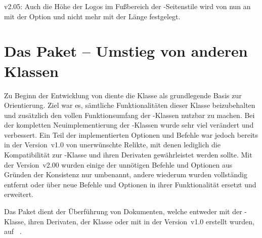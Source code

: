 \begin{Obsolete}{v2.05:}{}%
\printobsoletelist%
%
Auch die Höhe der Logos im Fußbereich der -Seitenstile 
wird von nun an mit der Option  und nicht mehr mit der 
Länge  festgelegt.
\end{Obsolete}



\section{Das Paket  -- Umstieg von anderen Klassen}
\begin{Bundle*}{}
%
%

\noindent{}

\bigskip\noindent
Zu Beginn der Entwicklung von \TUDScript diente die Klasse  als 
grundlegende Basis zur Orientierung. Ziel war es, sämtliche Funktionalitäten 
dieser Klasse beizubehalten und zusätzlich den vollen Funktionsumfang der 
\KOMAScript-Klassen nutzbar zu machen. Bei der kompletten Neuimplementierung 
der \TUDScript-Klassen wurde sehr viel verändert und verbessert. Ein Teil der 
implementierten Optionen und Befehle war jedoch bereits in der Version~v1.0 von 
\TUDScript unerwünschte Relikte, mit denen lediglich die Kompatibilität zur 
-Klasse und ihren Derivaten gewährleistet werden sollte. Mit 
der Version~v2.00 wurden einige der unnötigen Befehle und Optionen aus Gründen 
der Konsistenz nur umbenannt, andere wiederum wurden vollständig entfernt oder 
über neue Befehle und Optionen in ihrer Funktionalität ersetzt und erweitert. 

Das Paket  dient der Überführung von Dokumenten, welche
entweder mit der -Klasse, ihren Derivaten, 
der Klasse  oder mit \TUDScript in der Version~v1.0 
erstellt wurden, auf \TUDScript~\vTUDScript. 


\end{Bundle*}
